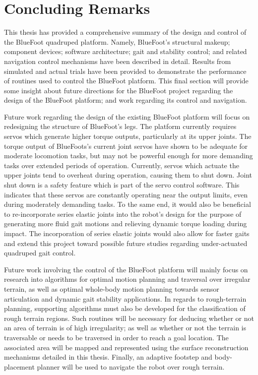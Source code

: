 \chapter{Concluding Remarks}
	\label{ch::conclusion}

	This thesis has provided a comprehensive summary of the design and control of the BlueFoot quadruped platform. Namely, BlueFoot's structural makeup; component devices; software architecture; gait and stability control; and related navigation control mechanisms have been described in detail. Results from simulated and actual trials have been provided to demonstrate the performance of routines used to control the BlueFoot platform. This final section will provide some insight about future directions for the BlueFoot project regarding the design of the BlueFoot platform; and work regarding its control and navigation.


	Future work regarding the design of the existing BlueFoot platform will focus on redesigning the structure of BlueFoot's legs. The platform currently requires servos which generate higher torque outputs, particularly at its upper joints. The torque output of BlueFoots's current joint servos have shown to be adequate for moderate locomotion tasks, but may not be powerful enough for more demanding tasks over extended periods of operation. Currently, servos which actuate the upper joints tend to overheat during operation, causing them to shut down. Joint shut down is a safety feature which is part of the servo control software. This indicates that these servos are constantly operating near the output limits, even during moderately demanding tasks. To the same end, it would also be beneficial to re-incorporate series elastic joints into the robot's design for the purpose of generating more fluid gait motions and relieving dynamic torque loading during impact. The incorporation of series elastic joints would also allow for faster gaits and extend this project toward possible future studies regarding under-actuated quadruped gait control.


	Future work involving the control of the BlueFoot platform will mainly focus on research into algorithms for optimal motion planning and traversal over irregular terrain, as well as optimal whole-body motion planning towards sensor articulation and dynamic gait stability applications. In regards to rough-terrain planning, supporting algorithms must also be developed for the classification of rough terrain regions. Such routines will be necessary for deducing whether or not an area of terrain is of high irregularity; as well as whether or not the terrain is traversable or needs to be traversed in order to reach a goal location. The associated area will be mapped and represented using the surface reconstruction mechanisms detailed in this thesis. Finally, an adaptive footstep and body-placement planner will be used to navigate the robot over rough terrain. 


